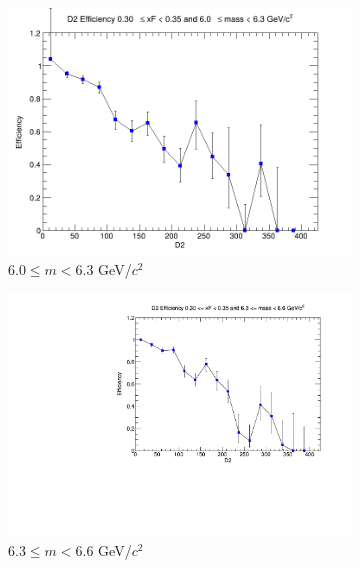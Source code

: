 \begin{figure}[p]
\begin{subfigure}[b]{0.32\textwidth}
        \includegraphics[width=\textwidth]{./kTrackerEfficiencyPlots/D2_Efficiency_xF6_mass6.png}
        \caption{$6.0 \leq m < 6.3$ GeV/$c^2$}
        \label{fig:xF6_mass6}
    \end{subfigure}
    \hfill
    \begin{subfigure}[b]{0.32\textwidth}
        \centering
        \includegraphics[width=\textwidth]{./kTrackerEfficiencyPlots/D2_Efficiency_xF6_mass7.pdf}
        \caption{$6.3 \leq m < 6.6$ GeV/$c^2$}
        \label{fig:xF6_mass7}
    \end{subfigure}
    \hfill
    \begin{subfigure}[b]{0.32\textwidth}
        \centering

\end{subfigure}
\end{figure}
